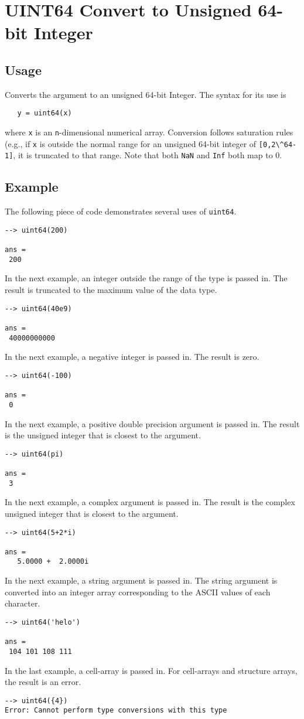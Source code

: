 \section{UINT64 Convert to Unsigned 64-bit Integer}

\subsection{Usage}

Converts the argument to an unsigned 64-bit Integer.  The syntax
for its use is
\begin{verbatim}
   y = uint64(x)
\end{verbatim}
where \verb|x| is an \verb|n|-dimensional numerical array.  Conversion
follows saturation rules (e.g., if \verb|x| is outside the normal
range for an unsigned 64-bit integer of \verb|[0,2\^64-1]|, it is
truncated to that range.  Note that both \verb|NaN| and \verb|Inf| both map to 0.
\subsection{Example}

The following piece of code demonstrates several uses of \verb|uint64|.
\begin{verbatim}
--> uint64(200)

ans = 
 200 
\end{verbatim}
In the next example, an integer outside the range  of the type is passed in.
The result is truncated to the maximum value of the data type.
\begin{verbatim}
--> uint64(40e9)

ans = 
 40000000000 
\end{verbatim}
In the next example, a negative integer is passed in.  The result is zero.
\begin{verbatim}
--> uint64(-100)

ans = 
 0 
\end{verbatim}
In the next example, a positive double precision argument is passed in.  
The result is the unsigned integer that is closest to the argument.
\begin{verbatim}
--> uint64(pi)

ans = 
 3 
\end{verbatim}
In the next example, a complex argument is passed in.  The result is the 
complex unsigned integer that is closest to the argument.
\begin{verbatim}
--> uint64(5+2*i)

ans = 
   5.0000 +  2.0000i 
\end{verbatim}
In the next example, a string argument is passed in.  The string argument is 
converted into an integer array corresponding to the ASCII values of each character.
\begin{verbatim}
--> uint64('helo')

ans = 
 104 101 108 111 
\end{verbatim}
In the last example, a cell-array is passed in.  For cell-arrays and structure 
arrays, the result is an error.
\begin{verbatim}
--> uint64({4})
Error: Cannot perform type conversions with this type
\end{verbatim}
